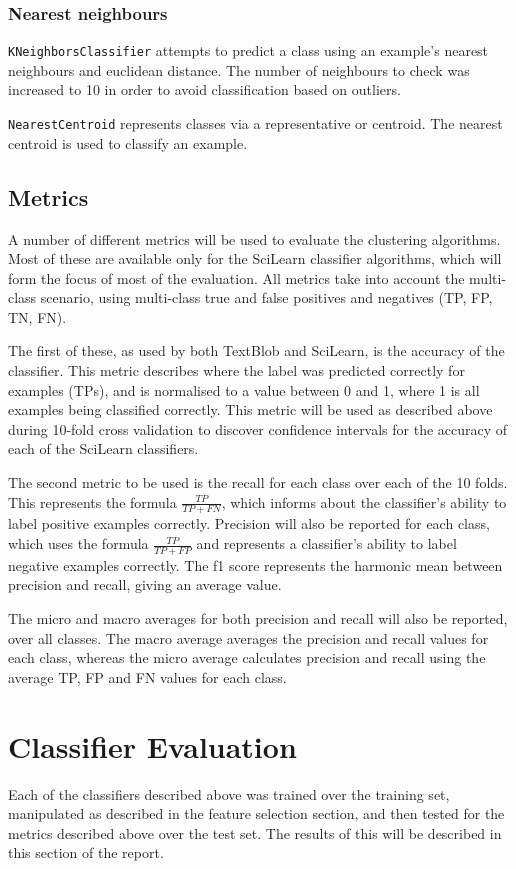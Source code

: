 \documentclass{article}
\begin{document}
\subsubsection{Nearest neighbours}
\verb|KNeighborsClassifier| attempts to predict a class using an example's nearest neighbours and euclidean distance. The number of neighbours to check was increased to 10 in order to avoid classification based on outliers. 

\verb|NearestCentroid| represents classes via a representative or centroid.  The nearest centroid is used to classify an example.

\subsection{Metrics}
A number of different metrics will be used to evaluate the clustering algorithms. Most of these are available only for the SciLearn classifier algorithms, which will form the focus of most of the evaluation. All metrics take into account the multi-class scenario, using multi-class true and false positives and negatives (TP, FP, TN, FN).

The first of these, as used by both TextBlob and SciLearn, is the accuracy of the classifier. This metric describes where the label was predicted correctly for examples (TPs), and is normalised to a value between 0 and 1, where 1 is all examples being classified correctly. This metric will be used as described above during 10-fold cross validation to discover confidence intervals for the accuracy of each of the SciLearn classifiers.

The second metric to be used is the recall for each class over each of the 10 folds. This represents the formula $\frac{TP}{TP+FN}$, which informs about the classifier's ability to label positive examples correctly. Precision will also be reported for each class, which uses the formula $\frac{TP}{TP+FP}$ and represents a classifier's ability to label negative examples correctly. The f1 score represents the harmonic mean between precision and recall, giving an average value. 

The micro and macro averages for both precision and recall will also be reported, over all classes. The macro average averages the precision and recall values for each class, whereas the micro average calculates precision and recall using the average TP, FP and FN values for each class.

\section{Classifier Evaluation}
Each of the classifiers described above was trained over the training set, manipulated as described in the feature selection section, and then tested for the metrics described above over the test set. The results of this will be described in this section of the report.
\end{document}
